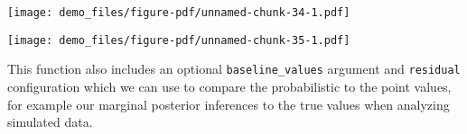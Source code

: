 \documentclass[
  letterpaper,
  DIV=11,
  numbers=noendperiod]{scrartcl}
\newenvironment{Shaded}{\begin{snugshade}}{\end{snugshade}}
\newcommand{\AttributeTok}[1]{\textcolor[rgb]{0.40,0.45,0.13}{#1}}
\newcommand{\ControlFlowTok}[1]{\textcolor[rgb]{0.00,0.23,0.31}{#1}}
\newcommand{\DecValTok}[1]{\textcolor[rgb]{0.68,0.00,0.00}{#1}}
\newcommand{\FunctionTok}[1]{\textcolor[rgb]{0.28,0.35,0.67}{#1}}
\newcommand{\NormalTok}[1]{\textcolor[rgb]{0.00,0.23,0.31}{#1}}
\newcommand{\OtherTok}[1]{\textcolor[rgb]{0.00,0.23,0.31}{#1}}
\newcommand{\SpecialCharTok}[1]{\textcolor[rgb]{0.37,0.37,0.37}{#1}}
\newcommand{\StringTok}[1]{\textcolor[rgb]{0.13,0.47,0.30}{#1}}
\begin{document}
\texttt{[image: demo\_files/figure-pdf/unnamed-chunk-34-1.pdf]}

\begin{Shaded}
\end{Shaded}

\texttt{[image: demo\_files/figure-pdf/unnamed-chunk-35-1.pdf]}

This function also includes an optional \texttt{baseline\_values}
argument and \texttt{residual} configuration which we can use to compare
the probabilistic to the point values, for example our marginal
posterior inferences to the true values when analyzing simulated data.
\end{document}
